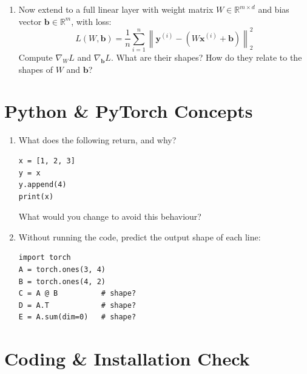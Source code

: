 \documentclass[12pt, a4paper]{scrartcl}
\begin{document}
\begin{enumerate}
Compute
    $\nabla_\mathbf{w} L$ and $\dfrac{\partial L}{\partial b}$. What is the
    shape of $\nabla_\mathbf{w} L$?

    \item Now extend to a full linear layer with weight matrix $W \in
    \mathbb{R}^{m \times d}$ and bias vector $\mathbf{b} \in \mathbb{R}^m$,
    with loss:
    \[
    L(W, \mathbf{b}) = \frac{1}{n}\sum_{i=1}^{n}
    \left\|\mathbf{y}^{(i)} - \left(W\mathbf{x}^{(i)} + \mathbf{b}\right)\right\|_2^2
    \]
    Compute $\nabla_W L$ and $\nabla_\mathbf{b} L$. What
    are their shapes? How do they relate to the shapes of $W$ and $\mathbf{b}$?

\end{enumerate}


\section{Python \& PyTorch Concepts}

\begin{enumerate}
\item What does the following return, and why?

\begin{verbatim}
x = [1, 2, 3]
y = x
y.append(4)
print(x)
\end{verbatim}

What would you change to avoid this behaviour?

\item Without running the code, predict the output shape of each line:

\begin{verbatim}
import torch
A = torch.ones(3, 4)
B = torch.ones(4, 2)
C = A @ B          # shape?
D = A.T            # shape?
E = A.sum(dim=0)   # shape?
\end{verbatim}

\end{enumerate}

\section{Coding \& Installation Check}
\end{document}
